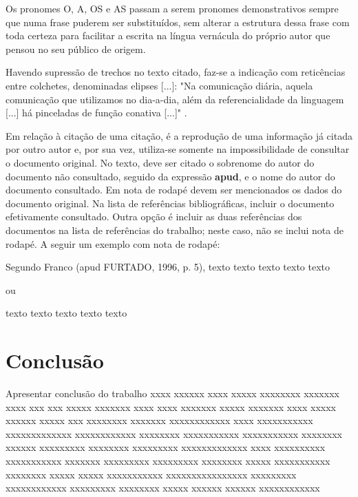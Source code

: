\documentclass[
	oneside,
	english,brazil,				%
	mestrado,ppgc
	]
	{infufrgs}
\begin{document}
\begin{citacao}
	Os pronomes O, A, OS e AS passam a serem pronomes demonstrativos sempre que
numa frase puderem ser substituídos, sem alterar a estrutura dessa frase com toda
certeza para facilitar a escrita na língua vernácula do próprio autor que pensou no
seu público de origem. \cite[p.~19]{simoes}
\end{citacao}

Havendo supressão de trechos no texto citado, faz-se a indicação com reticências entre
colchetes, denominadas elipses [...]: "Na comunicação diária, aquela comunicação que
utilizamos no dia-a-dia, além da referencialidade da linguagem [...] há pinceladas de função
conativa [...]" \cite[p.~37]{chalhub}.

Em relação à citação de uma citação, é a reprodução de uma informação já citada por
outro autor e, por sua vez, utiliza-se somente na impossibilidade de consultar o documento
original. No texto, deve ser citado o sobrenome do autor do documento não consultado,
seguido da expressão \textbf{apud}, e o nome do autor do documento consultado. Em nota de rodapé
devem ser mencionados os dados do documento original. Na lista de referências
bibliográficas, incluir o documento efetivamente consultado. Outra opção é incluir as duas
referências dos documentos na lista de referências do trabalho; neste caso, não se inclui nota
de rodapé. A seguir um exemplo com nota de rodapé:

	Segundo Franco (apud FURTADO, 1996, p. 5), texto texto texto texto texto 

ou

	texto texto texto texto texto 

\chapter{Conclusão}
Apresentar
conclusão
do
trabalho
xxxx xxxxxx xxxx xxxxx xxxxxxxx xxxxxxx
xxxx xxx xxx xxxxx xxxxxxx xxxx xxxx xxxxxxx xxxxx xxxxxxx xxxx xxxxx xxxxxx xxxxx xxx
xxxxxxxx xxxxxxx xxxxxxxxxxxx xxxx xxxxxxxxxxx xxxxxxxxxxxxx xxxxxxxxxxxx xxxxxxxx
xxxxxxxxxxx xxxxxxxxxxx xxxxxxxx xxxxxx xxxxxxxxx xxxxxxxx xxxxxxxxx xxxxxxxxxxxxx
xxxx xxxxxxxxxx xxxxxxxxxxx xxxxxxx xxxxxxxxx xxxxxxxxx xxxxxxxx xxxxx xxxxxxxxxxx
xxxxxxxx xxxxx xxxxx xxxxxxxxxxx xxxxxxxxxxxxxxxx xxxxxxxxx xxxxxxxxxxxx xxxxxxxxx
xxxxxxxx xxxxx xxxxxx xxxxxx xxxxxxxxxxxx
\end{document}
